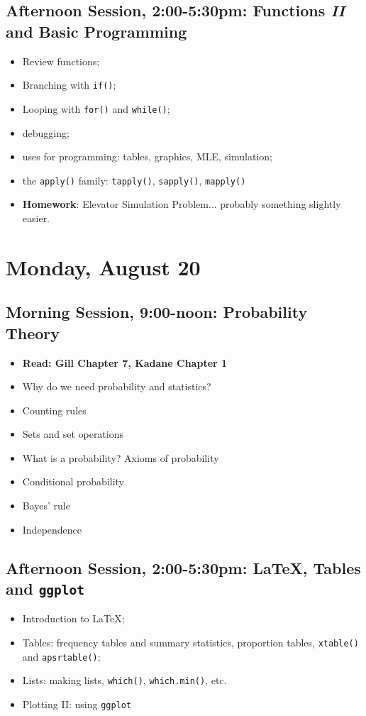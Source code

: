 \documentclass[12pt,a4paper]{article}
\begin{document}
\subsection*{Afternoon Session, 2:00-5:30pm: Functions \emph{II} and Basic Programming}
\begin{itemize}
\setlength{\itemsep}{0pt}
\footnotesize
\item Review functions;
\item Branching with \texttt{if()};
\item Looping with \texttt{for()} and \texttt{while()};
\item debugging;
\item uses for programming: tables, graphics, MLE, simulation;
\item the \texttt{apply()} family: \texttt{tapply()}, \texttt{sapply()}, \texttt{mapply()}
\item \textbf{Homework}: Elevator Simulation Problem... probably something slightly easier.
\end{itemize}



\section*{Monday, August 20}

\subsection*{Morning Session, 9:00-noon: Probability Theory}
\begin{itemize}
\setlength{\itemsep}{0pt}
\footnotesize
\item \textbf{Read: Gill Chapter 7, Kadane Chapter 1}
\item Why do we need probability and statistics?
\item Counting rules
\item Sets and set operations
\item What is a probability? Axioms of probability
\item Conditional probability
\item Bayes' rule
\item Independence

\end{itemize}


\subsection*{Afternoon Session, 2:00-5:30pm: \LaTeX, Tables and \texttt{ggplot}}
\begin{itemize}
\setlength{\itemsep}{0pt}
\footnotesize
\item Introduction to \LaTeX;
\item Tables: frequency tables and summary statistics, proportion tables, \texttt{xtable()} and \texttt{apsrtable()};
\item Lists: making lists, \texttt{which()}, \texttt{which.min()}, etc.
\item Plotting II: using \texttt{ggplot}
\end{itemize}
\end{document}
